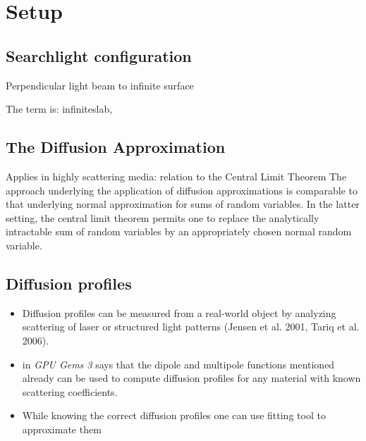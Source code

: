 \chapter{Setup}
\label{chapter:Setup}

\section{Searchlight configuration}
Perpendicular light beam to infinite surface \cite{Jacques1995}

The term is: \gls{infiniteslab},

\section{The Diffusion Approximation}
Applies in highly scattering media: relation to the Central Limit Theorem
The approach underlying the application of diffusion approximations is comparable to that underlying normal approximation for
sums of random variables. In the latter setting, the central limit theorem
permits one to replace the analytically intractable sum of random variables by
an appropriately chosen normal random variable.

\section{Diffusion profiles}
\begin{itemize}
\item{Diffusion profiles can be measured from a real-world object
by analyzing scattering of laser or structured light patterns (Jensen et al. 2001, Tariq et al. 2006).}
\item{\cite{Nguyen:2007:GG:1407436} in \textit{GPU Gems 3} says that
the dipole and multipole functions mentioned already can be used to compute diffusion profiles
for any material with known scattering coefficients.}
\item{While knowing the correct diffusion profiles one can use fitting tool to approximate them \cite{Nguyen:2007:GG:1407436}}
\end{itemize}